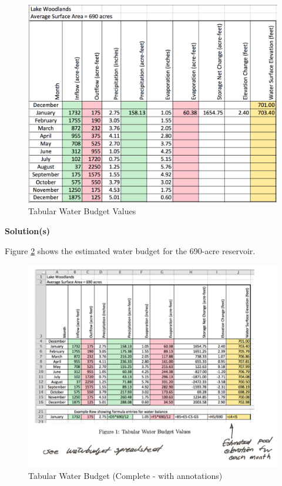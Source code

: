 \documentclass[12pt]{article}
\begin{document}
\begin{enumerate}
\begin{figure}[h!] %
   \centering
   \includegraphics[width=6in]{Reservior.pdf} 
   \caption{Tabular Water Budget Values}
   \label{fig:reservoir}
\end{figure}

\textbf{Solution(s)}

Figure \ref{fig:es2-pr2-scan} shows the estimated water budget for the 690-acre reservoir.

\begin{figure}[h!] %
   \centering
   \includegraphics[width=6in]{es2-pr2-scan.png} 
   \caption{Tabular Water Budget (Complete - with annotations)}
   \label{fig:es2-pr2-scan}
\end{figure}

\end{enumerate}
\end{document}
